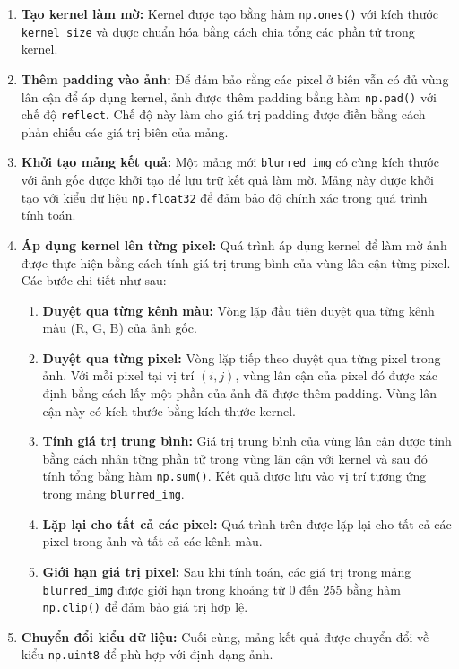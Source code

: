 \begin{enumerate}

	\item \textbf{Tạo kernel làm mờ:}
	      Kernel được tạo bằng hàm \texttt{np.ones()} với kích thước \texttt{kernel\_size} và được chuẩn hóa bằng cách chia tổng các phần tử trong kernel.

	\item \textbf{Thêm padding vào ảnh:}
	      Để đảm bảo rằng các pixel ở biên vẫn có đủ vùng lân cận để áp dụng kernel, ảnh được thêm padding bằng hàm \texttt{np.pad()} với chế độ \texttt{reflect}. Chế độ này làm cho giá trị padding được điền bằng cách phản chiếu các giá trị biên của mảng.

	\item \textbf{Khởi tạo mảng kết quả:}
	      Một mảng mới \texttt{blurred\_img} có cùng kích thước với ảnh gốc được khởi tạo để lưu trữ kết quả làm mờ. Mảng này được khởi tạo với kiểu dữ liệu \texttt{np.float32} để đảm bảo độ chính xác trong quá trình tính toán.
	\item \textbf{Áp dụng kernel lên từng pixel:}
	      Quá trình áp dụng kernel để làm mờ ảnh được thực hiện bằng cách tính giá trị trung bình của vùng lân cận từng pixel. Các bước chi tiết như sau:

	      \begin{enumerate}


		      \item \textbf{Duyệt qua từng kênh màu:}
		            Vòng lặp đầu tiên duyệt qua từng kênh màu (R, G, B) của ảnh gốc.

		      \item \textbf{Duyệt qua từng pixel:}
		            Vòng lặp tiếp theo duyệt qua từng pixel trong ảnh. Với mỗi pixel tại vị trí \((i, j)\), vùng lân cận của pixel đó được xác định bằng cách lấy một phần của ảnh đã được thêm padding. Vùng lân cận này có kích thước bằng kích thước kernel.

		      \item \textbf{Tính giá trị trung bình:}
		            Giá trị trung bình của vùng lân cận được tính bằng cách nhân từng phần tử trong vùng lân cận với kernel và sau đó tính tổng bằng hàm \texttt{np.sum()}. Kết quả được lưu vào vị trí tương ứng trong mảng \texttt{blurred\_img}.

		      \item \textbf{Lặp lại cho tất cả các pixel:}
		            Quá trình trên được lặp lại cho tất cả các pixel trong ảnh và tất cả các kênh màu.

		      \item \textbf{Giới hạn giá trị pixel:}
		            Sau khi tính toán, các giá trị trong mảng \texttt{blurred\_img} được giới hạn trong khoảng từ 0 đến 255 bằng hàm \texttt{np.clip()} để đảm bảo giá trị hợp lệ.



	      \end{enumerate}
	\item \textbf{Chuyển đổi kiểu dữ liệu:}
	      Cuối cùng, mảng kết quả được chuyển đổi về kiểu \texttt{np.uint8} để phù hợp với định dạng ảnh.

\end{enumerate}

